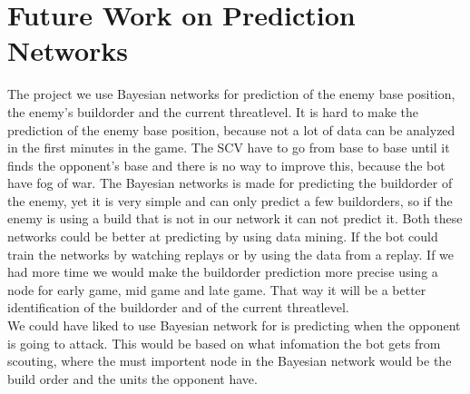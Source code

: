 \section{Future Work on Prediction Networks}
	The project we use Bayesian networks for prediction of the enemy base position, the enemy's buildorder and the current threatlevel. 
	It is hard to make the prediction of the enemy base position, because not a lot of data can be analyzed in the first minutes in the game. The
	SCV have to go from base to base until it finds the opponent's base and there is no way to improve this, because the bot have fog of war.
	The Bayesian networks is made for predicting the buildorder of the enemy, yet it is very simple and can only predict a few buildorders, so if the enemy 		is using a build that is not in our network it can not predict it. Both these networks could be better at predicting by using data mining. If the 
	bot could train the networks by watching replays or by using the data from a replay. If we had more time we would make the buildorder prediction 
	more precise using a node for early game, mid game and late game. That way it will be a better identification of the buildorder and of the current 
	threatlevel. \\
		We could have liked to use Bayesian network for is predicting when the opponent is going to attack. This would be based on what 				infomation the bot gets from scouting, where the must importent node in the Bayesian network would be the build order and the units the opponent
	have. 